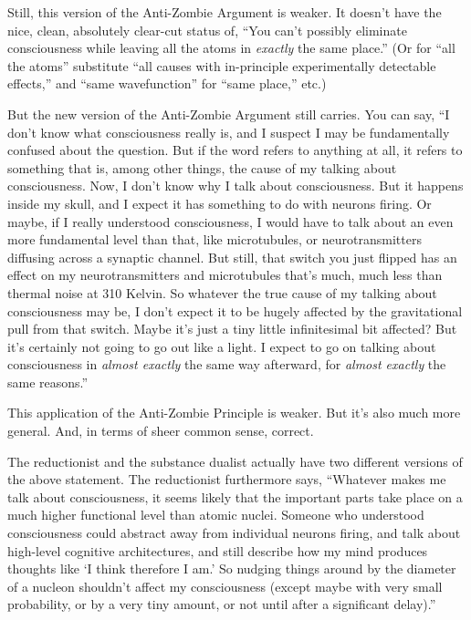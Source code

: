 {
 Still, this version of the Anti-Zombie Argument is weaker. It
doesn't have the nice, clean, absolutely clear-cut
status of, ``You can't possibly
eliminate consciousness while leaving all the atoms in \textit{exactly}
the same place.'' (Or for ``all the
atoms'' substitute ``all causes with
in-principle experimentally detectable effects,'' and
``same wavefunction'' for
``same place,'' etc.)}

{
 But the new version of the Anti-Zombie Argument still carries. You
can say, ``I don't know what
consciousness really is, and I suspect I may be fundamentally confused
about the question. But if the word refers to anything at all, it
refers to something that is, among other things, the cause of my
talking about consciousness. Now, I don't know why I
talk about consciousness. But it happens inside my skull, and I expect
it has something to do with neurons firing. Or maybe, if I really
understood consciousness, I would have to talk about an even more
fundamental level than that, like microtubules, or neurotransmitters
diffusing across a synaptic channel. But still, that switch you just
flipped has an effect on my neurotransmitters and microtubules
that's much, much less than thermal noise at 310
Kelvin. So whatever the true cause of my talking about consciousness
may be, I don't expect it to be hugely affected by the
gravitational pull from that switch. Maybe it's just a
tiny little infinitesimal bit affected? But it's
certainly not going to go out like a light. I expect to go on talking
about consciousness in \textit{almost exactly} the same way afterward,
for \textit{almost exactly} the same reasons.''}

{
 This application of the Anti-Zombie Principle is weaker. But
it's also much more general. And, in terms of sheer
common sense, correct.}

{
 The reductionist and the substance dualist actually have two
different versions of the above statement. The reductionist furthermore
says, ``Whatever makes me talk about consciousness, it
seems likely that the important parts take place on a much higher
functional level than atomic nuclei. Someone who understood
consciousness could abstract away from individual neurons firing, and
talk about high-level cognitive architectures, and still describe how
my mind produces thoughts like `I think therefore I
am.' So nudging things around by the diameter of a
nucleon shouldn't affect my consciousness (except maybe
with very small probability, or by a very tiny amount, or not until
after a significant delay).''}

